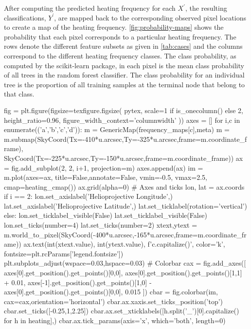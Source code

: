 After computing the predicted heating frequency for each $X^\prime$, the resulting classifications, $Y^\prime$, are mapped back to the corresponding observed pixel locations to create a map of the heating frequency. \autoref{fig:probability-maps} shows the probability that each pixel corresponds to a particular heating frequency. The rows denote the different feature subsets as given in \autoref{tab:cases} and the columns correspond to the different heating frequency classes. The class probability, as computed by the scikit-learn package, in each pixel is the mean class probability of all trees in the random forest classifier. The class probability for an individual tree is the proportion of all training samples at the terminal node that belong to that class.

\begin{pycode}[manager_ml]
fig = plt.figure(figsize=texfigure.figsize(
    pytex,
    scale=1 if is_onecolumn() else 2,
    height_ratio=0.96,
    figure_width_context='columnwidth'
))
axes = []
for i,c in enumerate(('a','b','c','d')):
    m = GenericMap(frequency_maps[c],meta)
    m = m.submap(SkyCoord(Tx=-410*u.arcsec,Ty=-325*u.arcsec,frame=m.coordinate_frame),
                 SkyCoord(Tx=-225*u.arcsec,Ty=-150*u.arcsec,frame=m.coordinate_frame))
    ax = fig.add_subplot(2, 2, i+1, projection=m)
    axes.append(ax)
    im = m.plot(axes=ax, title=False,annotate=False, vmin=-0.5, vmax=2.5, cmap=heating_cmap())
    ax.grid(alpha=0)
    # Axes and ticks
    lon, lat = ax.coords
    if i == 2:
        lon.set_axislabel('Helioprojective Longitude',)
        lat.set_axislabel('Helioprojective Latitude',)
        lat.set_ticklabel(rotation='vertical')
    else:
        lon.set_ticklabel_visible(False)
        lat.set_ticklabel_visible(False)
    lon.set_ticks(number=4)
    lat.set_ticks(number=2)
    xtext,ytext = m.world_to_pixel(SkyCoord(-400*u.arcsec,-165*u.arcsec,frame=m.coordinate_frame))
    ax.text(int(xtext.value), int(ytext.value), f'{c.capitalize()}', color='k', fontsize=plt.rcParams['legend.fontsize'])
plt.subplots_adjust(wspace=0.03,hspace=0.03)
# Colorbar
cax = fig.add_axes([
    axes[0].get_position().get_points()[0,0],
    axes[0].get_position().get_points()[1,1] + 0.01,
    axes[-1].get_position().get_points()[1,0] - axes[0].get_position().get_points()[0,0],
    0.015
])
cbar = fig.colorbar(im, cax=cax,orientation='horizontal')
cbar.ax.xaxis.set_ticks_position('top')
cbar.set_ticks([-0.25,1,2.25])
cbar.ax.set_xticklabels([h.split('_')[0].capitalize() for h in heating],)
cbar.ax.tick_params(axis='x', which='both', length=0)

\end{pycode}
